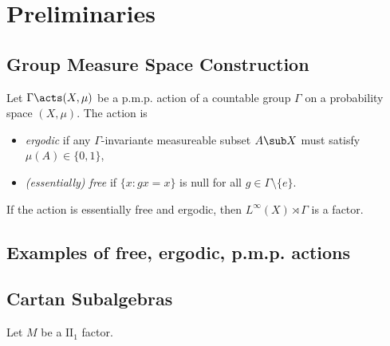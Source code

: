 \documentclass[../main.tex]{subfiles}
\begin{document}
\section{Preliminaries}

\subsection{Group Measure Space Construction}

Let $ \Gamma\acts (X,\mu) $ be a p.m.p. action of a countable group $ \Gamma $ on a probability space $ (X,\mu) $. The action is 
\begin{itemize}
    \item \textit{ergodic} if any $ \Gamma $-invariante measureable subset $ A\sub X $ must satisfy $ \mu(A)\in \{0,1\} $,
    \item \textit{(essentially) free} if $ \{x: gx = x\} $ is null for all $ g\in \Gamma\setminus \{e\} $.
\end{itemize}
If the action is essentially free and ergodic, then $ L^{\infty}(X)\rtimes \Gamma $ is a factor.

\subsection{Examples of free, ergodic, p.m.p. actions}

\subsection{Cartan Subalgebras}

Let $ M $ be a $ \text{II}_{1} $ factor. 
\[

\]
\end{document}
